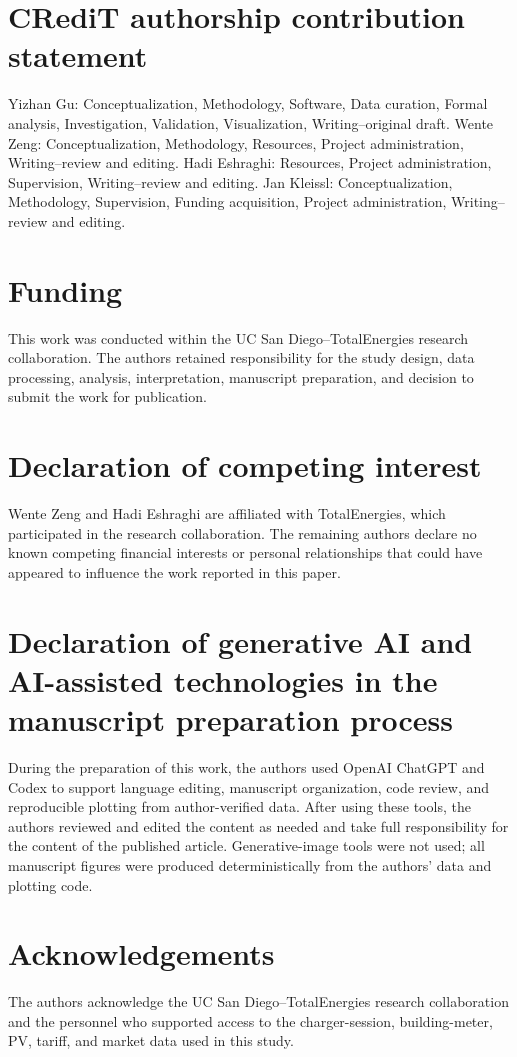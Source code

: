\documentclass[final,5p,times]{elsarticle}
\begin{document}
\section*{CRediT authorship contribution statement}
Yizhan Gu: Conceptualization, Methodology, Software, Data curation, Formal
analysis, Investigation, Validation, Visualization, Writing--original draft.
Wente Zeng: Conceptualization, Methodology, Resources, Project administration,
Writing--review and editing. Hadi Eshraghi: Resources, Project administration,
Supervision, Writing--review and editing. Jan Kleissl: Conceptualization,
Methodology, Supervision, Funding acquisition, Project administration,
Writing--review and editing.

\section*{Funding}
This work was conducted within the UC San Diego--TotalEnergies research
collaboration. The authors retained responsibility for the study design, data
processing, analysis, interpretation, manuscript preparation, and decision to
submit the work for publication.

\section*{Declaration of competing interest}
Wente Zeng and Hadi Eshraghi are affiliated with TotalEnergies, which
participated in the research collaboration. The remaining authors declare no
known competing financial interests or personal relationships that could have
appeared to influence the work reported in this paper.

\section*{Declaration of generative AI and AI-assisted technologies in the manuscript preparation process}
During the preparation of this work, the authors used OpenAI ChatGPT and Codex
to support language editing, manuscript organization, code review, and
reproducible plotting from author-verified data. After using these tools, the
authors reviewed and edited the content as needed and take full responsibility
for the content of the published article. Generative-image tools were not used;
all manuscript figures were produced deterministically from the authors' data
and plotting code.

\section*{Acknowledgements}
The authors acknowledge the UC San Diego--TotalEnergies research collaboration
and the personnel who supported access to the charger-session, building-meter,
PV, tariff, and market data used in this study.

\clearpage


\end{document}
